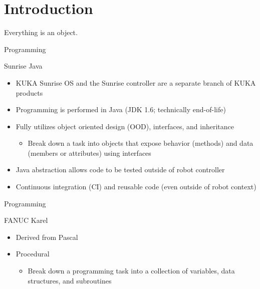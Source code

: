 \documentclass{beamer}
\begin{document}
\section{Introduction}

\begin{frame}[standout]
  \alert{Everything} is an object.
\end{frame}

\begin{frame}{Programming}
  \begin{block}{Sunrise Java}
    \begin{itemize}
      \item KUKA Sunrise OS and the Sunrise controller are a separate branch of KUKA products
      \item Programming is performed in Java (JDK 1.6; technically end-of-life)
      \item Fully utilizes object oriented design (OOD), interfaces, and inheritance
      \begin{itemize}
        \item Break down a task into objects that expose behavior (methods) and data (members or attributes) using interfaces
      \end{itemize}
      \item Java abstraction allows code to be tested outside of robot controller
      \item Continuous integration (CI) and reusable code (even outside of robot context)
    \end{itemize}
  \end{block}
\end{frame}

\begin{frame}{Programming}
  \begin{block}{FANUC Karel}
    \begin{itemize}
      \item Derived from Pascal
      \item Procedural
      \begin{itemize}
        \item Break down a programming task into a collection of variables, data structures, and subroutines
      \end{itemize}
    \end{itemize}
  \end{block}
\end{frame}
\end{document}
